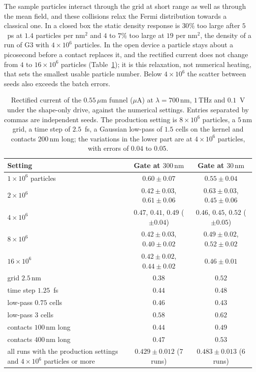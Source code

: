 \documentclass[aps,prapplied,onecolumn,superscriptaddress,floatfix]{revtex4-2}
\newcommand{\um}{\,\mu\mathrm{m}}
\newcommand{\nm}{\,\mathrm{nm}}
\newcommand{\THz}{\,\mathrm{THz}}
\begin{document}
The sample particles interact through the grid at short range as well as
through the mean field, and these collisions relax the Fermi distribution
towards a classical one. In a closed box the static density response is
$30\%$ too large after $5$~ps at $1.4$ particles per nm$^{2}$ and $4$ to
$7\%$ too large at $19$ per nm$^{2}$, the density of a run of G3 with
$4\times10^{6}$ particles. In the open device a particle stays about a
picosecond before a contact replaces it, and the rectified current does
not change from $4$ to $16\times10^{6}$ particles
(Table~\ref{tab:picconv}); it is this relaxation, not numerical heating,
that sets the smallest usable particle number. Below $4\times10^{6}$ the
scatter between seeds also exceeds the batch errors.

\begin{table}[ht]
\caption{Rectified current of the $0.55\um$ funnel ($\mu$A) at
$\lambda=700\nm$, $1\THz$ and $0.1$~V under the shape-only drive, against
the numerical settings. Entries separated by commas are independent
seeds. The production setting is $8\times10^{6}$ particles, a $5\nm$
grid, a time step of $2.5$~fs, a Gaussian low-pass of $1.5$ cells on the
kernel and contacts $200\nm$ long; the variations in the lower part are
at $4\times10^{6}$ particles, with errors of $0.04$ to $0.05$.}
\label{tab:picconv}
\begin{ruledtabular}
\begin{tabular}{lcc}
Setting & Gate at $300\nm$ & Gate at $30\nm$ \\
\hline
$1\times10^{6}$ particles & $0.60\pm0.07$ & $0.55\pm0.04$ \\
$2\times10^{6}$ & $0.42\pm0.03$, $0.61\pm0.06$ & $0.63\pm0.03$, $0.45\pm0.06$ \\
$4\times10^{6}$ & $0.47$, $0.41$, $0.49$ ($\pm0.04$) & $0.46$, $0.45$, $0.52$ ($\pm0.05$) \\
$8\times10^{6}$ & $0.42\pm0.03$, $0.40\pm0.02$ & $0.49\pm0.02$, $0.52\pm0.02$ \\
$16\times10^{6}$ & $0.42\pm0.02$, $0.44\pm0.02$ & $0.46\pm0.01$ \\
\hline
grid $2.5\nm$ & $0.38$ & $0.52$ \\
time step $1.25$~fs & $0.44$ & $0.48$ \\
low-pass $0.75$ cells & $0.46$ & $0.43$ \\
low-pass $3$ cells & $0.58$ & $0.62$ \\
contacts $100\nm$ long & $0.44$ & $0.49$ \\
contacts $400\nm$ long & $0.47$ & $0.53$ \\
\hline
all runs with the production settings and $4\times10^{6}$ particles or more & $0.429\pm0.012$ (7 runs) & $0.483\pm0.013$ (6 runs) \\
\end{tabular}
\end{ruledtabular}
\end{table}
\end{document}
